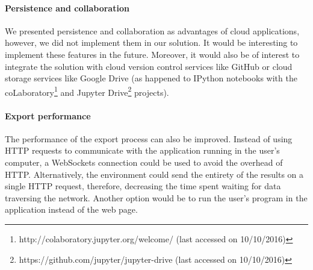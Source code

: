 \paragraph{Persistence and collaboration}
We presented persistence and collaboration as advantages of cloud applications, however, we did not implement them in our solution.
It would be interesting to implement these features in the future.
Moreover, it would also be of interest to integrate the solution with cloud version control services like GitHub or cloud storage services like Google Drive (as happened to IPython notebooks with the coLaboratory\footnote{http://colaboratory.jupyter.org/welcome/ (last accessed on 10/10/2016)} and Jupyter Drive\footnote{https://github.com/jupyter/jupyter-drive (last accessed on 10/10/2016)} projects).

\paragraph{Export performance}
The performance of the export process can also be improved.
Instead of using HTTP requests to communicate with the application running in the user's computer, a WebSockets connection\cite{rfc6455} could be used to avoid the overhead of HTTP.
Alternatively, the environment could send the entirety of the results on a single HTTP request, therefore, decreasing the time spent waiting for data traversing the network.
Another option would be to run the user's program in the application instead of the web page.












